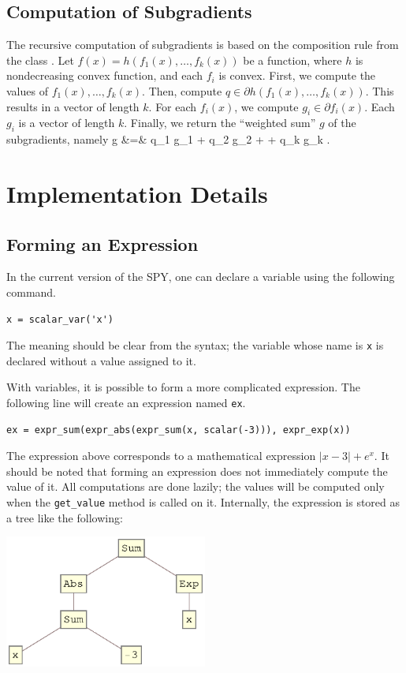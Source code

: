 \documentclass[12pt]{article}
\begin{document}
\subsection{Computation of Subgradients}
The recursive computation of subgradients is based on the composition rule from the class \cite{subg}. Let $f(x) = h(f_1(x), \ldots, f_k(x))$ be a function, where $h$ is nondecreasing convex function, and each $f_i$ is convex. First, we compute the values of $f_1(x), \ldots, f_k(x)$. Then, compute $q \in \partial h(f_1(x), \ldots, f_k(x))$. This results in a vector of length $k$. For each $f_i(x)$, we compute $g_i \in \partial f_i(x)$. Each $g_i$ is a vector of length $k$. Finally, we return the ``weighted sum'' $g$ of the subgradients, namely
\BEAS
g &=& q_1 g_1 + q_2 g_2 + \cdots + q_k g_k \; .
\EEAS

\section{Implementation Details}
\subsection{Forming an Expression}
In the current version of the SPY, one can declare a variable using the following command.
\begin{verbatim}
x = scalar_var('x')
\end{verbatim}
The meaning should be clear from the syntax; the variable whose name is \verb'x' is declared without a value assigned to it.

With variables, it is possible to form a more complicated expression. The following line will create an expression named \verb'ex'.
\begin{verbatim}
ex = expr_sum(expr_abs(expr_sum(x, scalar(-3))), expr_exp(x))
\end{verbatim}
The expression above corresponds to a mathematical expression $|x-3|+e^x$. It should be noted that forming an expression does not immediately compute the value of it. All computations are done lazily; the values will be computed only when the \verb'get_value' method is called on it. Internally, the expression is stored as a tree like the following:

\begin{center}
\includegraphics[width=0.5\textwidth]{expr}
\end{center}
\end{document}
